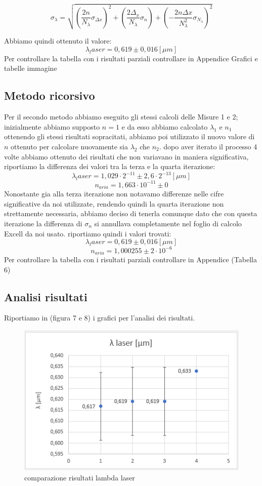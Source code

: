 \documentclass{article}
\begin{document}
\begin{equation} 
\sigma_\lambda= \sqrt{(\frac{2 n}{N_\lambda} \sigma_{\Delta x})^2 + (\frac{2 \Delta_x}{N_\lambda} \sigma_n) + ({-} \frac{2 n \Delta x}{N_\lambda^2} \sigma_{N_\lambda})^2} 
\end{equation}

Abbiamo quindi ottenuto il valore:
\[ \lambda_laser = 0,619 \pm 0,016 [\mu m] \]
Per controllare la tabella con i risultati parziali controllare in Appendice Grafici e tabelle immagine %



\subsection{Metodo ricorsivo}
Per il secondo metodo abbiamo eseguito gli stessi calcoli delle Misure 1 e 2; inizialmente abbiamo supposto $n = 1$ e da esso abbiamo calcolato $\lambda_1$ e $n_1$ ottenendo gli stessi risultati sopracitati, abbiamo poi utilizzato il nuovo valore di $n$ ottenuto per calcolare nuovamente sia $\lambda_2$ che $n_2$. dopo aver iterato il processo 4 volte abbiamo ottenuto dei risultati che non variavano in maniera significativa, riportiamo la differenza dei valori tra la terza e la quarta iterazione:
\[ \lambda_laser = 1,029 \cdot 2^{-11} \pm 2,6 \cdot 2^{-13} [\mu m] \]
\[ n_{aria} = 1,663 \cdot 10^{-11} \pm 0 \]
Nonostante gia alla terza iterazione non notavamo differenze nelle cifre significative da noi utilizzate, rendendo quindi la quarta iterazione non strettamente necessaria, abbiamo deciso di tenerla comunque dato che con questa iterazione la differenza di $\sigma_n$ si annullava completamente nel foglio di calcolo Excell da noi usato. riportiamo quindi i valori trovati:
\[ \lambda_laser = 0,619 \pm 0,016 [\mu m] \]
\[ n_{aria} = 1,000255 \pm 2 \cdot 10^{-6} \]
Per controllare la tabella con i risultati parziali controllare in Appendice (Tabella 6)



\subsection{Analisi risultati}
Riportiamo in (figura 7 e 8) i grafici per l'analisi dei risultati.

\begin{figure}[h!]
  \centering
  \includegraphics[width=0.6\linewidth]{IM grafico risultati lambda}
  \caption{comparazione risultati lambda laser}
\end{figure}
\end{document}
